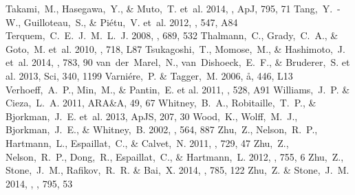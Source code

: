 \documentclass[apj]{emulateapj-rtx4}
\begin{document}
\begin{thebibliography}{}
   Takami,~M., Hasegawa,~Y., \& Muto,~T. et~al. 2014, \apj, ApJ, 795, 71
   Tang,~Y.~-W., Guilloteau,~S., \& Pi\'{e}tu,~V. et~al. 2012, \aap, 547, A84 
   Terquem,~C.~E.~J.~M.~L.~J. 2008, \apj, 689, 532
   Thalmann,~C., Grady,~C.~A., \& Goto,~M. et~al. 2010, \apj, 718, L87 
   Tsukagoshi,~T., Momose,~M., \& Hashimoto,~J. et~al. 2014, \apj, 783, 90
   van~der~Marel,~N., van~Dishoeck,~E.~F., \& Bruderer,~S. et al. 2013, Sci, 340, 1199 
   Varni\'{e}re,~P. \& Tagger,~M. 2006, \aa, 446, L13
   Verhoeff,~A.~P., Min,~M., \& Pantin,~E. et al. 2011, \aap, 528, A91
   Williams,~J.~P. \& Cieza,~L.~A. 2011, ARA\&A, 49, 67
   Whitney,~B.~A., Robitaille,~T.~P., \& Bjorkman,~J.~E. et~al. 2013, ApJS, 207, 30 
   Wood,~K., Wolff,~M.~J., Bjorkman,~J.~E., \& Whitney,~B. 2002, \apj, 564, 887 
   Zhu,~Z., Nelson,~R.~P., Hartmann,~L., Espaillat,~C., \& Calvet,~N. 2011, \apj, 729, 47
   Zhu,~Z., Nelson,~R.~P., Dong,~R., Espaillat,~C., \& Hartmann,~L. 2012, \apj, 755, 6 
   Zhu,~Z., Stone,~J.~M., Rafikov,~R.~R. \& Bai,~X. 2014, \apj, 785, 122
   Zhu,~Z. \& Stone,~J.~M. 2014, \apj, \apj, 795, 53
    
  \end{thebibliography}

\clearpage
\end{document}
